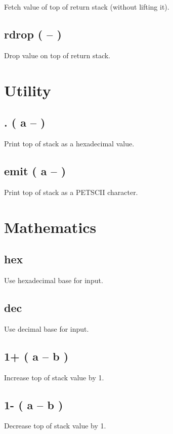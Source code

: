 Fetch value of top of return stack (without lifting it).

\subsection{rdrop ( -- )}

Drop value on top of return stack.


\section{Utility}

\subsection{. ( a -- )}

Print top of stack as a hexadecimal value.

\subsection{emit ( a -- )}

Print top of stack as a PETSCII character.


\section{Mathematics}

\subsection{hex}

Use hexadecimal base for input.

\subsection{dec}

Use decimal base for input.

\subsection{1+ ( a -- b )}

Increase top of stack value by 1.

\subsection{1- ( a -- b )}

Decrease top of stack value by 1.

